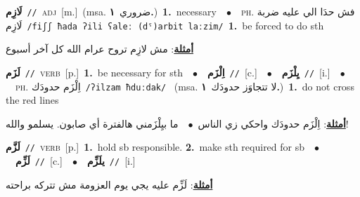 \documentclass[10pt,a4paper,twoside]{article} %
\begin{document}
\begin{multicols}{2}
{\setlength\topsep{0pt}\textbf{\foreignlanguage{arabic}{لَازِم}}\ {\color{gray}\texttt{//}\color{black}}\ \textsc{adj}\ [m.]\ \color{gray}(msa. \foreignlanguage{arabic}{ضروري}~\foreignlanguage{arabic}{\textbf{١.}})\color{black}\ \textbf{1.}~necessary\ \ $\bullet$\ \ \textsc{ph.} \color{gray} \foreignlanguage{arabic}{فش حدَا الي عليه ضربة لَازِم}\color{black}\ {\color{gray}\texttt{/{\sffamily fiʃʃ ħada ʔili ʕaleː (dˤ)arbit laːzim}/}\color{black}}\ \textbf{1.}~be forced to do sth\  \begin{flushright}\color{gray}\foreignlanguage{arabic}{\textbf{\underline{\foreignlanguage{arabic}{أمثلة}}}: مش لازِم تروح عرام الله كل آخر أسبوع}\end{flushright}\color{black}} \vspace{2mm}

{\setlength\topsep{0pt}\textbf{\foreignlanguage{arabic}{لَزَم}}\ {\color{gray}\texttt{//}\color{black}}\ \textsc{verb}\ [p.]\ \textbf{1.}~be necessary for sth\ \ $\bullet$\ \ \setlength\topsep{0pt}\textbf{\foreignlanguage{arabic}{اِلْزَم}}\ {\color{gray}\texttt{//}\color{black}}\ [c.]\ \ $\bullet$\ \ \setlength\topsep{0pt}\textbf{\foreignlanguage{arabic}{يِلْزَم}}\ {\color{gray}\texttt{//}\color{black}}\ [i.]\ \ $\bullet$\ \ \textsc{ph.} \color{gray} \foreignlanguage{arabic}{اِلْزَم حدودَك}\color{black}\ {\color{gray}\texttt{/{\sffamily ʔilzam ħduːdak}/}\color{black}}\ \color{gray} (msa. \foreignlanguage{arabic}{لا تتجاوَز حدودَك}~\foreignlanguage{arabic}{\textbf{١.}})\color{black}\ \textbf{1.}~do not cross the red lines\  \begin{flushright}\color{gray}\foreignlanguage{arabic}{\textbf{\underline{\foreignlanguage{arabic}{أمثلة}}}: اِلْزَم حدودَك واحكي زي الناس\ $\bullet$\ \  ما بيِلْزَمني هالفترة أي صابون. يسلمو والله!}\end{flushright}\color{black}} \vspace{2mm}

{\setlength\topsep{0pt}\textbf{\foreignlanguage{arabic}{لَزَّم}}\ {\color{gray}\texttt{//}\color{black}}\ \textsc{verb}\ [p.]\ \textbf{1.}~hold sb responsible.  \textbf{2.}~make sth required for sb\ \ $\bullet$\ \ \setlength\topsep{0pt}\textbf{\foreignlanguage{arabic}{لَزِّم}}\ {\color{gray}\texttt{//}\color{black}}\ [c.]\ \ $\bullet$\ \ \setlength\topsep{0pt}\textbf{\foreignlanguage{arabic}{يلَزِّم}}\ {\color{gray}\texttt{//}\color{black}}\ [i.]\  \begin{flushright}\color{gray}\foreignlanguage{arabic}{\textbf{\underline{\foreignlanguage{arabic}{أمثلة}}}: لَزِّم عليه يجي يوم العزومة مش تتركه براحته}\end{flushright}\color{black}} \vspace{2mm}


\end{multicols}
\end{document}
